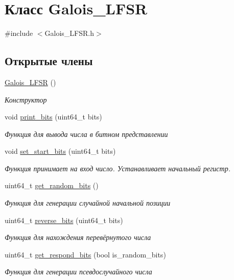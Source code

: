 \hypertarget{classGalois__LFSR}{}\section{Класс Galois\+\_\+\+L\+F\+SR}
\label{classGalois__LFSR}


{\ttfamily \#include $<$Galois\+\_\+\+L\+F\+S\+R.\+h$>$}

\subsection*{Открытые члены}
\begin{DoxyCompactItemize}
\item 
\hyperlink{classGalois__LFSR_a23455fca80e4ed521062a7b2842edb03}{Galois\+\_\+\+L\+F\+SR} ()
\begin{DoxyCompactList}\small\item\em Конструктор \end{DoxyCompactList}\item 
void \hyperlink{classGalois__LFSR_a7a2d2fa3f9f7973cb520d92267f58f4d}{print\+\_\+bits} (uint64\+\_\+t bits)
\begin{DoxyCompactList}\small\item\em Функция для вывода числа в битном представлении \end{DoxyCompactList}\item 
void \hyperlink{classGalois__LFSR_aa3a893992b929b01a649d859a121ae34}{set\+\_\+start\+\_\+bits} (uint64\+\_\+t bits)
\begin{DoxyCompactList}\small\item\em Функция принимает на вход число. Устанавливает начальный регистр. \end{DoxyCompactList}\item 
uint64\+\_\+t \hyperlink{classGalois__LFSR_abc5cfd0aa22803188a1f81a5959f22eb}{get\+\_\+random\+\_\+bits} ()
\begin{DoxyCompactList}\small\item\em Функция для генерации случайной начальной позиции \end{DoxyCompactList}\item 
uint64\+\_\+t \hyperlink{classGalois__LFSR_ae8b9c21348f0f6f75c539e7a8667be88}{reverse\+\_\+bits} (uint64\+\_\+t bits)
\begin{DoxyCompactList}\small\item\em Функция для нахождения перевёрнутого числа \end{DoxyCompactList}\item 
uint64\+\_\+t \hyperlink{classGalois__LFSR_a1ceda4d66d840ff703cd14a3919b2f8b}{get\+\_\+respond\+\_\+bits} (bool is\+\_\+random\+\_\+bits)
\begin{DoxyCompactList}\small\item\em Функция для генерации псевдослучайного числа \end{DoxyCompactList}\end{DoxyCompactItemize}


